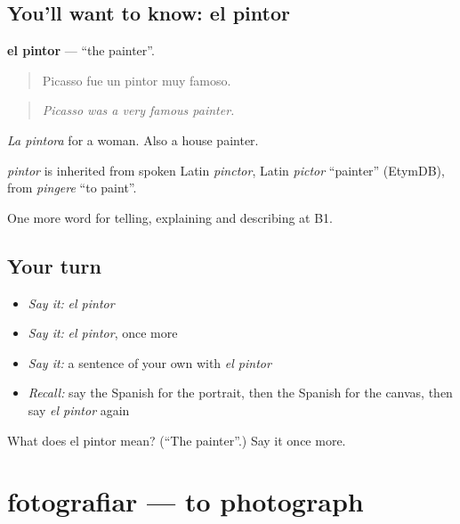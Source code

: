 \subsection*{You'll want to know: el pintor}
\textbf{el pintor} — \textquotedblleft{}the painter\textquotedblright{}.

\begin{quote}
Picasso fue un pintor muy famoso.
\end{quote}

\begin{quote}
\emph{Picasso was a very famous painter.}
\end{quote}

\emph{La pintora} for a woman. Also a house painter.

\begin{cousinweb}
\emph{pintor} is inherited from spoken Latin \emph{pinctor}, Latin \emph{pictor} \textquotedblleft{}painter\textquotedblright{} (EtymDB), from \emph{pingere} \textquotedblleft{}to paint\textquotedblright{}.
\end{cousinweb}

\begin{grammarlens}[title={What you've built}]
One more word for telling, explaining and describing at B1.
\end{grammarlens}

\subsection*{Your turn}
\begin{itemize}
\raggedright
  \item \emph{Say it:} \emph{el pintor}
  \item \emph{Say it:} \emph{el pintor}, once more
  \item \emph{Say it:} a sentence of your own with \emph{el pintor}
  \item \emph{Recall:} say the Spanish for the portrait, then the Spanish for the canvas, then say \emph{el pintor} again
\end{itemize}

\begin{tcolorbox}[breakable,colback=teal!4,colframe=teal!35!black,title={Before you move on}]
What does el pintor mean? (\textquotedblleft{}The painter\textquotedblright{}.) Say it once more.
\end{tcolorbox}
\section[fotografiar]{fotografiar — to photograph}

